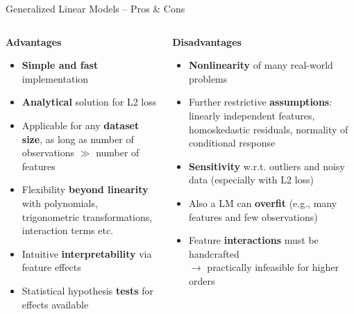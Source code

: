 \documentclass[11pt,compress,t,notes=noshow, xcolor=table]{beamer}
\newcommand{\highlight}[1]{\textcolor{hlcol}{\textbf{#1}}}
\newcommand{\positem}{\item[\textcolor{hlcol}{$\bm{+}$}]}
\newcommand{\negitem}{\item[\textcolor{hlcol}{$\bm{-}$}]}
\newenvironment{procon}{
\begin{itemize}
  \setlength{\itemsep}{1.5pt}
  \setlength{\parskip}{1.5pt}
}{\end{itemize}}
\begin{document}
\begin{vbframe}{Generalized Linear Models -- Pros \& Cons}

  \begin{columns}[onlytextwidth]
    \begin{column}{0.5\textwidth}
      \highlight{Advantages}
      
      \begin{procon}
        \setlength{\itemsep}{1pt}
        \setlength{\parskip}{1pt}
        \positem \textbf{Simple and fast} implementation
        \positem \textbf{Analytical} solution for L2 loss
        \positem Applicable for any \textbf{dataset size}, as long as number of 
        observations $\gg$ number of features
        \positem Flexibility \textbf{beyond linearity} with polynomials, 
        trigonometric transformations, interaction terms etc.
        \positem Intuitive \textbf{interpretability} via feature effects
        \positem Statistical hypothesis \textbf{tests} for effects available
      \end{procon}
    \end{column}
  
    \begin{column}{0.5\textwidth}
      \highlight{Disadvantages}
      
      \begin{itemize}
        \negitem \textbf{Nonlinearity} of many real-world problems
        \negitem Further restrictive \textbf{assumptions}: linearly independent 
        features, homoskedastic residuals, normality of conditional response 
        \negitem \textbf{Sensitivity} w.r.t. outliers and noisy data (especially 
        with L2 loss)
        \negitem Also a LM can \textbf{overfit} (e.g., many features and few observations) 
        \negitem Feature \textbf{interactions} must be handcrafted\\
        $\rightarrow$ practically infeasible for higher orders
      \end{itemize}
    \end{column}
  \end{columns}
  
\end{vbframe}
\end{document}
